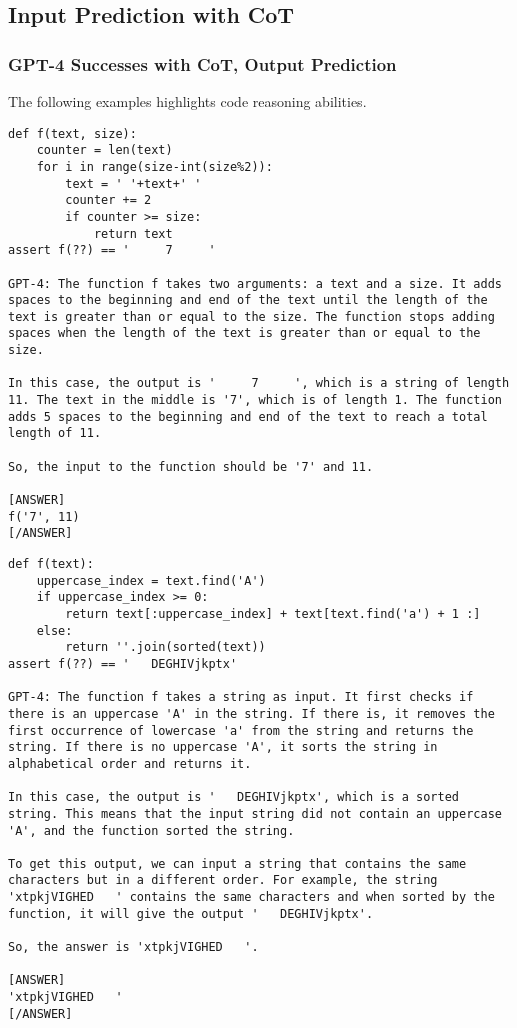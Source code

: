 \subsection{Input Prediction with CoT}
\subsubsection{GPT-4 Successes with CoT, Output Prediction}

The following examples highlights code reasoning abilities.
\begin{lstlisting}
def f(text, size):
    counter = len(text)
    for i in range(size-int(size%2)):
        text = ' '+text+' '
        counter += 2
        if counter >= size:
            return text
assert f(??) == '     7     '

GPT-4: The function f takes two arguments: a text and a size. It adds spaces to the beginning and end of the text until the length of the text is greater than or equal to the size. The function stops adding spaces when the length of the text is greater than or equal to the size.

In this case, the output is '     7     ', which is a string of length 11. The text in the middle is '7', which is of length 1. The function adds 5 spaces to the beginning and end of the text to reach a total length of 11.

So, the input to the function should be '7' and 11.

[ANSWER]
f('7', 11)
[/ANSWER]
\end{lstlisting}

\begin{lstlisting}
def f(text):
    uppercase_index = text.find('A')
    if uppercase_index >= 0:
        return text[:uppercase_index] + text[text.find('a') + 1 :]
    else:
        return ''.join(sorted(text))
assert f(??) == '   DEGHIVjkptx'

GPT-4: The function f takes a string as input. It first checks if there is an uppercase 'A' in the string. If there is, it removes the first occurrence of lowercase 'a' from the string and returns the string. If there is no uppercase 'A', it sorts the string in alphabetical order and returns it.

In this case, the output is '   DEGHIVjkptx', which is a sorted string. This means that the input string did not contain an uppercase 'A', and the function sorted the string.

To get this output, we can input a string that contains the same characters but in a different order. For example, the string 'xtpkjVIGHED   ' contains the same characters and when sorted by the function, it will give the output '   DEGHIVjkptx'.

So, the answer is 'xtpkjVIGHED   '.

[ANSWER]
'xtpkjVIGHED   '
[/ANSWER]    
\end{lstlisting}

